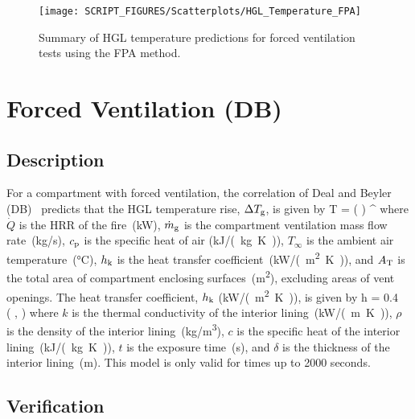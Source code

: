 \begin{figure}[!ht]
\begin{center}
\texttt{[image: SCRIPT\_FIGURES/Scatterplots/HGL\_Temperature\_FPA]}
\end{center}
\caption[Summary of HGL temperature predictions for forced ventilation tests (FPA)]
{Summary of HGL temperature predictions for forced ventilation tests using the FPA method.}
\label{HGL_Summary_Forced_Ventilation_FPA}
\end{figure}

\clearpage


\section{Forced Ventilation (DB)}

\subsection*{Description}

For a compartment with forced ventilation, the correlation of Deal and Beyler (DB)~\cite{SFPE:Walton} predicts that the HGL temperature rise, $\Delta T\sb{g}$, is given by
\be
\Delta T = \left(  \right) \quad ^
\label{eq:DB}
\ee
where $\dot Q$ is the HRR of the fire~(\si{kW}), $\dot m\sb{g}$ is the compartment ventilation mass flow rate~(\si{kg/s}), $c\sb{p}$ is the specific heat of air (\si{kJ/(kg.K)}), $T_\infty$ is the ambient air temperature~(\si{\celsius}), $h\sb{k}$ is the heat transfer coefficient~(\si{kW/(m^2.K)}), and $A\sb{T}$ is the total area of compartment enclosing surfaces~(\si{m^2}), excluding areas of vent openings. The heat transfer coefficient, $h\sb{k}$ (\si{kW/(m^2.K)}), is given by
\be
h = 0.4\  \left(  ,  \right)
\label{eq:DB_hk}
\ee
where $k$ is the thermal conductivity of the interior lining~(\si{kW/(m.K)}), $\rho$ is the density of the interior lining~(\si{kg/m^3}), $c$ is the specific heat of the interior lining~(\si{kJ/(kg.K)}), $t$ is the exposure time~(\si{\second}), and $\delta$ is the thickness of the interior lining~(\si{m}). This model is only valid for times up to 2000 seconds.

\subsection*{Verification}

